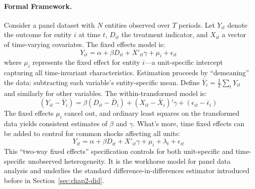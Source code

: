 \paragraph{Formal Framework.}
Consider a panel dataset with $N$ entities observed over $T$ periods.
Let $Y_{it}$ denote the outcome for entity $i$ at time $t$, $D_{it}$ the treatment indicator, and $X_{it}$ a vector of time-varying covariates.
The fixed effects model is:
\begin{equation}
    Y_{it} = \alpha + \beta D_{it} + X'_{it}\gamma + \mu_i + \epsilon_{it}
\end{equation}
where $\mu_i$ represents the fixed effect for entity $i$---a unit-specific intercept capturing all time-invariant characteristics.
Estimation proceeds by ``demeaning'' the data: subtracting each variable's entity-specific mean.
Define $\bar{Y}_i = \frac{1}{T}\sum_t Y_{it}$ and similarly for other variables.
The within-transformed model is:
\begin{equation}
    (Y_{it} - \bar{Y}_i) = \beta (D_{it} - \bar{D}_i) + (X_{it} - \bar{X}_i)'\gamma + (\epsilon_{it} - \bar{\epsilon}_i)
\end{equation}
The fixed effects $\mu_i$ cancel out, and ordinary least squares on the transformed data yields consistent estimates of $\beta$ and $\gamma$.
What's more, time fixed effects can be added to control for common shocks affecting all units:
\begin{equation}
    Y_{it} = \alpha + \beta D_{it} + X'_{it}\gamma + \mu_i + \lambda_t + \epsilon_{it}
\end{equation}
This ``two-way fixed effects'' specification controls for both unit-specific and time-specific unobserved heterogeneity.
It is the workhorse model for panel data analysis and underlies the standard difference-in-differences estimator introduced before in Section~\ref{sec:chap2-did}.


